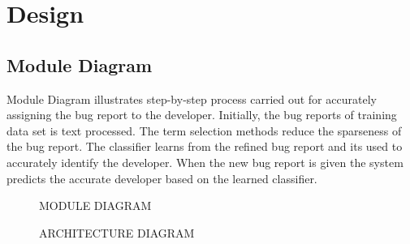 
\chapter{Design} %
\section{Module Diagram}
%
Module Diagram illustrates step-by-step process carried out for accurately assigning the bug report to the developer. Initially, the bug reports of training data set is text processed. The term selection methods reduce the sparseness of the bug report. The classifier learns from the refined bug report and its used to accurately identify the developer. When the new bug report is given the system predicts the accurate developer based on the learned classifier.
%

\newpage

\begin{figure}[hbt]
\begin{center}

\caption{MODULE DIAGRAM}
\end{center}
\end{figure}

%

\newpage
\begin{figure}[hbt]
\begin{center}

\caption{ARCHITECTURE DIAGRAM}
\end{center}

\end{figure}



%
